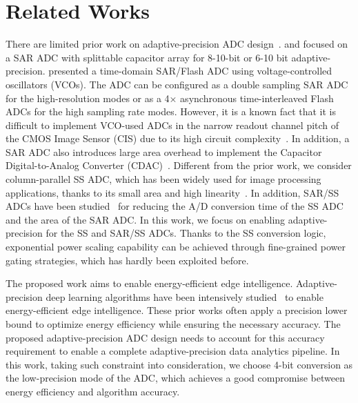\section{Related Works}\label{related}

There are limited prior work on adaptive-precision ADC design~\cite{zhu_06_2013,zhu_6--10-bit_2015,el-halwagy_100-mss5-gss_2018}. 
\cite{zhu_06_2013} and \cite{zhu_6--10-bit_2015} focused on a SAR ADC with splittable capacitor array for 8-10-bit or 6-10 bit adaptive-precision. 
\cite{el-halwagy_100-mss5-gss_2018} presented a time-domain SAR/Flash ADC using voltage-controlled oscillators (VCOs). The ADC can be configured as a double sampling SAR ADC for the high-resolution modes or as a 4× asynchronous time-interleaved Flash ADCs for the high sampling rate modes.
However, it is a known fact that it is difficult to implement VCO-used ADCs in the narrow readout channel pitch of the CMOS Image Sensor (CIS) due to its high circuit complexity~\cite{kim_area-efficient_2016}. In addition, a SAR ADC also introduces large area overhead to implement the Capacitor Digital-to-Analog Converter (CDAC)~\cite{funatsu_62_2015}.
Different from the prior work, we consider column-parallel SS ADC, which has been widely used for image processing applications, 
thanks to its small area and high linearity~\cite{kim_11-bit_2021,nie_single_2020,kumagai_14-inch_2018,park_640_2020}. 
In addition, SAR/SS ADCs have been studied~\cite{kim_area-efficient_2016,chen_12_2014} for reducing the A/D conversion time of 
the SS ADC and the area of the SAR ADC.     
In this work, we focus on enabling adaptive-precision for the SS and SAR/SS ADCs. Thanks to the SS conversion logic, exponential power 
scaling capability can be achieved through fine-grained power gating strategies, which has hardly been exploited before.


The proposed work aims to enable energy-efficient edge intelligence.  Adaptive-precision deep learning algorithms have been intensively studied~\cite{leibe_xnor-net_2016,li_ternary_2016,park_energy-efficient_2018} to enable energy-efficient edge intelligence. These prior works often apply a precision lower bound to optimize energy efficiency while ensuring the necessary accuracy.  The proposed adaptive-precision ADC design needs to account for this accuracy requirement to enable a complete adaptive-precision data analytics pipeline.  In this work, taking such constraint into consideration, we choose 4-bit conversion as the low-precision mode of the ADC, which achieves a good compromise between energy efficiency and algorithm accuracy. 

